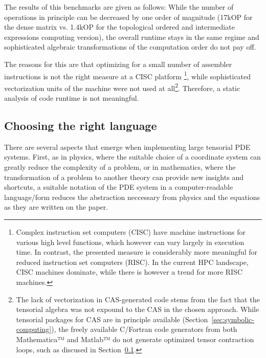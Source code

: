The results of this benchmarks are given as follows: While the number of
operations in principle can be decreased by one order of magnitude
(17kOP for the dense matrix vs. 1.4kOP for the topological ordered and
intermediate expressions computing version), the overall runtime stays in the
same regime and sophisticated algebraic transformations of the computation
order do not pay off.

The reasons for this are that optimizing for a small
number of assembler instructions is not the right measure at a CISC platform
\footnote{Complex instruction set computers (CISC) have machine instructions
  for various high level functions, which however can vary largely in execution
  time. In contrast, the presented measure is considerably more meaningful for
  reduced instruction set computers (RISC). In the current HPC landscape, CISC
  machines dominate, while there is however a trend for more RISC machines.},
while sophisticated vectorization units of the machine were
not used at all\footnote{
  The lack of vectorization in CAS-generated code stems from the fact that the tensorial algebra was not
  expound to the CAS in the chosen approach. While tensorial packages for CAS
  are in principle available (\cf Section~\vref{sec:symbolic-computing}),
  the freely available C/Fortran code generators from both Mathematica™ and
  Matlab™ do not generate optimized tensor contraction loops, such as discused in 
  Section~\ref{sec:implementing-ccz4-language}.
}. Therefore, a static analysis of code runtime is not meaningful.



\subsection{Choosing the right language}\label{sec:implementing-ccz4-language}
There are several aspects that emerge when implementing large tensorial PDE systems.
First, as in physics, where the suitable choice of a coordinate system
can greatly reduce the complexity of a problem, or in mathematics, where
the transformation of a problem to another theory can provide new insights
and shortcuts, a suitable notation of the PDE system in a
computer-readable language/form reduces the abstraction neccessary from physics and
the equations as they are written on the paper.

